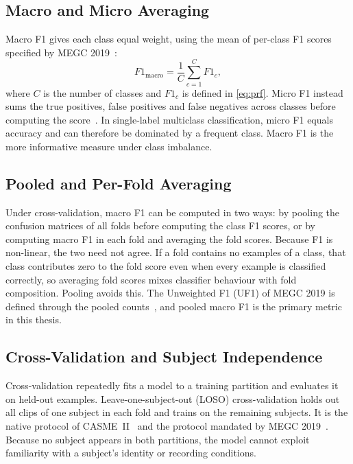 \subsection{Macro and Micro Averaging}
\label{sec:macro-micro}

Macro F1 gives each class equal weight, using the mean of per-class F1 scores specified by MEGC 2019~\cite{see2019}:
\begin{equation}
	F1_{\mathrm{macro}}=\frac1C\sum_{c=1}^{C}F1_c,
	\label{eq:macro-f1}
\end{equation}
where $C$ is the number of classes and $F1_c$ is defined in \eqref{eq:prf}. Micro F1 instead sums the true positives, false positives and false negatives across classes before computing the score~\cite{sokolova2009}. In single-label multiclass classification, micro F1 equals accuracy and can therefore be dominated by a frequent class. Macro F1 is the more informative measure under class imbalance.

\subsection{Pooled and Per-Fold Averaging}
\label{sec:pooled-vs-fold}

Under cross-validation, macro F1 can be computed in two ways: by pooling the confusion matrices of all folds before computing the class F1 scores, or by computing macro F1 in each fold and averaging the fold scores. Because F1 is non-linear, the two need not agree. If a fold contains no examples of a class, that class contributes zero to the fold score even when every example is classified correctly, so averaging fold scores mixes classifier behaviour with fold composition. Pooling avoids this. The Unweighted F1 (UF1) of MEGC 2019 is defined through the pooled counts~\cite{see2019}, and pooled macro F1 is the primary metric in this thesis.

\subsection{Cross-Validation and Subject Independence}
\label{sec:cross-validation}

Cross-validation repeatedly fits a model to a training partition and evaluates it on held-out examples. Leave-one-subject-out (LOSO) cross-validation holds out all clips of one subject in each fold and trains on the remaining subjects. It is the native protocol of CASME~II~\cite{yan2014} and the protocol mandated by MEGC 2019~\cite{see2019}. Because no subject appears in both partitions, the model cannot exploit familiarity with a subject's identity or recording conditions.

